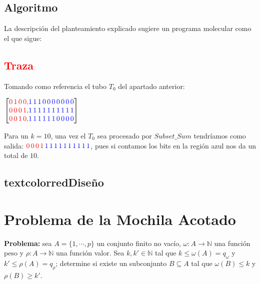 \documentclass[12pt, letterpaper, twoside]{article}
\begin{document}
    \subsection{Algoritmo}
    La descripción del planteamiento explicado sugiere un programa molecular como el que sigue:
    \begin{algorithm}
        \begin{algorithmic}[1]
            \EndProcedure
        \end{algorithmic}
    \end{algorithm}
    \subsection{\textcolor{red}{Traza}}
    Tomando como referencia el tubo $T_0$ del apartado anterior:


    $
        \begin{bmatrix}
            \textcolor{red}{0\,1\,0\,0,} \textcolor{blue}{1\,1\,1\,0\,0\,0\,0\,0\,0\,0} \\
            \textcolor{red}{0\,0\,0\,1,} \textcolor{blue}{1\,1\,1\,1\,1\,1\,1\,1\,1\,1} \\
            \textcolor{red}{0\,0\,1\,0,} \textcolor{blue}{1\,1\,1\,1\,1\,1\,0\,0\,0\,0}
        \end{bmatrix}
    $


    Para un $k=10$, una vez el $T_0$ sea procesado por $Subset\_Sum$ tendríamos como salida: $\textcolor{red}{0\,0\,0\,1\,} \textcolor{blue}{1\,1\,1\,1\,1\,1\,1\,1\,1\,1}$, pues si contamos los bits en la región azul nos da un total de $10$.

    \subsection{textcolor{red}{Diseño}}
    \section{Problema de la Mochila Acotado}
    \textbf{Problema:} sea $A=\{1,\cdots,p\}$ un conjunto finito no vacío, $\omega:A\rightarrow\mathbb{N}$ una función peso y $\rho:A\rightarrow\mathbb{N}$ una función valor. Sea $k, k'\in\mathbb{N}$ tal que $k\leq\omega(A)=q_\omega$ y $k'\leq\rho(A)=q_\rho$; determine si existe un subconjunto $B\subseteq A$ tal que $\omega(B)\leq k$ y $\rho(B)\geq k'$.
\end{document}

